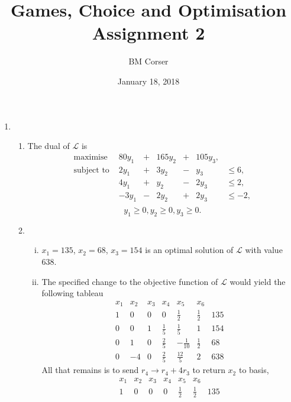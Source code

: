 \documentclass[10pt]{article}
\author{BM Corser}
\title{Games, Choice and Optimisation Assignment 2}
\date{January 18, 2018}
\begin{document}
  \maketitle 
  \begin{enumerate}
    \item
      \begin{enumerate}
      \item The dual of $\mathcal{L}$ is
        $$
        \begin{array}{rrcrcrl}
          \text{maximise   }   &   80y_1 &  + & 165y_2 & + & 105y_3, \\
          \text{subject to   } &   2y_1  &  + & 3y_2  & - & y_3    &\leq 6, \\
                               &   4y_1  &  + & y_2   & - & 2y_3   &\leq 2, \\
                               &  -3y_1  &  - & 2y_2  & + & 2y_3   &\leq -2, \\
        \end{array}
        $$
        $$y_1 \geq 0, y_2 \geq 0, y_3 \geq 0.$$
    \item
      \begin{enumerate}[(i)]
        \item $x_1 = 135$, $x_2 = 68$, $x_3 = 154$ is an optimal solution of
          $\mathcal{L}$ with value 638.
        \item The specified change to the objective function of $\mathcal{L}$
          would yield the following tableau
          $$
          \begin{array}{rrrrrr|r}
            x_1 & x_2 & x_3 & x_4 & x_5 & x_6 \\
            \hline
            1 & 0 & 0 & 0 & \tfrac{1}{2} & \tfrac{1}{2} & 135 \\
            0 & 0 & 1 & \tfrac{1}{5} & \tfrac{1}{5} & 1 & 154 \\
            0 & 1 & 0 & \tfrac{2}{5} & -\tfrac{1}{10} & \tfrac{1}{2} & 68 \\
            \hline
            0 & -4 & 0 & \tfrac{2}{5} & \tfrac{12}{5} & 2 & 638
          \end{array}
          $$
          All that remains is to send $r_4 \rightarrow r_4 + 4r_3$ to return
          $x_2$ to basis,
          $$
          \begin{array}{rrrrrr|r}
            x_1 & x_2 & x_3 & x_4 & x_5 & x_6 \\
            \hline
            1 & 0 & 0 & 0 & \tfrac{1}{2} & \tfrac{1}{2} & 135 \\

\end{array}$$
\end{enumerate}
\end{enumerate}
\end{enumerate}
\end{document}
